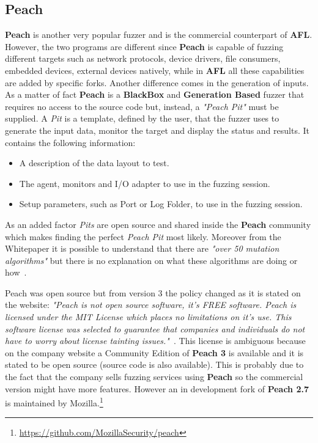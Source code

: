 \documentclass[../main.tex]{subfiles}
\begin{document}
\subsection{Peach}

\textbf{Peach} is another very popular fuzzer and is the commercial counterpart of \textbf{AFL}. However, the two programs are different since \textbf{Peach} is capable of fuzzing different targets such as network protocols, device drivers, file consumers, embedded devices, external devices natively, while in \textbf{AFL} all these capabilities are added by specific forks. Another difference comes in the generation of inputs. As a matter of fact \textbf{Peach} is a \textbf{BlackBox} and \textbf{Generation Based} fuzzer that requires no access to the source code but, instead, a \textit{"Peach Pit"} must be supplied. A \textit{Pit} is a template, defined by the user, that the fuzzer uses to generate the input data, monitor the target and display the status and results. It contains the following information:

\begin{itemize}
  \item A description of the data layout to test.
  \item The agent, monitors and I/O adapter to use in the fuzzing session.
  \item Setup parameters, such as Port or Log Folder, to use in the fuzzing session.
\end{itemize}

As an added factor \textit{Pits} are open source and shared inside the \textbf{Peach} community which makes finding the perfect \textit{Peach Pit} most likely. Moreover from the Whitepaper it is possible to understand that there are \textit{"over 50 mutation algorithms"} but there is no explanation on what these algorithms are doing or how~\cite{peach}.

Peach was open source but from version 3 the policy changed as it is stated on the website: \textit{"Peach is not open source software, it’s FREE software. Peach is licensed under the MIT License which places no limitations on it’s use. This software license was selected to guarantee that companies and individuals do not have to worry about license tainting issues."}~\cite{peachlicense}. This license is ambiguous because on the company website a Community Edition of \textbf{Peach 3} is available and it is stated to be open source (source code is also available). This is probably due to the fact that the company sells fuzzing services using \textbf{Peach} so the commercial version might have more features. However an in development fork of \textbf{Peach 2.7} is maintained by Mozilla.\footnote{\url{https://github.com/MozillaSecurity/peach}}
\end{document}
